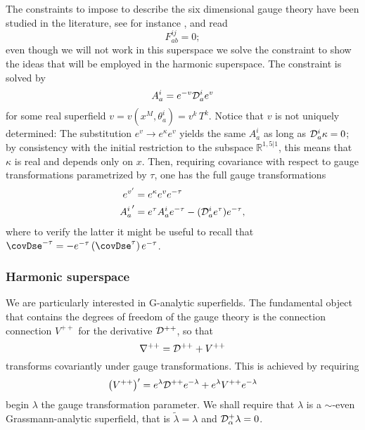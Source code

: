 The constraints to impose to describe the six dimensional gauge theory have been studied in the literature, see for instance \cite{Nilsson:1980nz, Koller:1982cs}, and read
\begin{equation}
\label{6d-gauge-constr1}
F_{ab}^{ij} = 0;
\end{equation}
even though we will not work in this superspace we solve the constraint to show the ideas that will be employed in the harmonic superspace.
The constraint is solved by
\begin{equation}
\label{6d-gauge-Aialpha}
A^i_a
	=
e^{-v} { \mathcal{D} }^i_a e^{v}
\end{equation}
for some real superfield $v=v(x^M,\theta^i_a) = v^k \, T^k$.
Notice  that $v$ %
is not uniquely determined: The substitution $e^v \rightarrow e^{\kappa} e^{v}$ yields the same $A^i_a$ as long as ${ \mathcal{D} }_a^i \kappa = 0 $; by consistency with the initial restriction to the subspace $\mathbb{R}^{1,5|1}$, this means that $\kappa$ is real and depends only on $x$.
Then, requiring covariance with respect to gauge transformations parametrized by $\tau$, one has the full gauge transformations
\begin{align}
e^{v'}
	& =
e^{\kappa} e^{v}e^{- \tau}
\\
{A_a^i} '
	& =
e^{\tau} A_a^i e^{-\tau} 
- 
( { \mathcal{D} }_a^i e^{\tau}) e^{-\tau},
\end{align}
where to verify the latter it might be useful to recall that $ \covDs%
e^{-\tau} = - e^{-\tau} \left( \covDs%
e^\tau \right) e^{-\tau} $.




\subsubsection{Harmonic superspace}




We are particularly interested in G-analytic superfields. The fundamental object that contains the degrees of freedom of the gauge theory is the connection connection $V^{++}$ for the derivative ${ \mathcal{D} }^{++}$, so that
\begin{equation}\label{covds++}
{ \mathcal{\nabla} }^{++} = { \mathcal{D} }^{++} + V^{++} 
\end{equation}
transforms covariantly under gauge transformations. This is achieved by requiring
\begin{equation}\label{v++-gage-intiial}
\left( V^{++} \right)' = e^{\lambda} { \mathcal{D} }^{++} e^{-\lambda} + e^{\lambda} V^{++} e^{-\lambda}
\end{equation}
begin $\lambda$ the gauge transformation parameter. We shall require that $\lambda$ is a $\sim$-even Grassmann-analytic superfield, that is $\tilde{\lambda}=\lambda$ and ${ \mathcal{D} }^+_\alpha \lambda = 0$.

